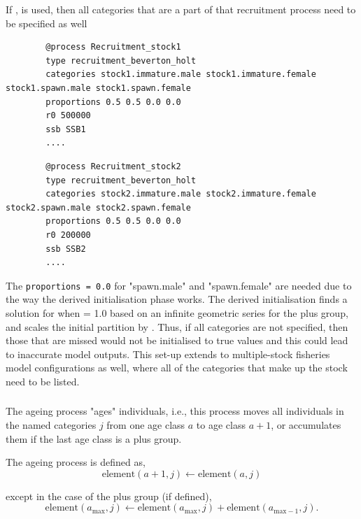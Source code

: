 If ,  is used, then all categories that are a part of that recruitment process need to be specified as well

{\small{\begin{verbatim}
		@process Recruitment_stock1
		type recruitment_beverton_holt
		categories stock1.immature.male stock1.immature.female stock1.spawn.male stock1.spawn.female
		proportions 0.5 0.5 0.0 0.0
		r0 500000
		ssb SSB1
		....
\end{verbatim}}}

{\small{\begin{verbatim}
		@process Recruitment_stock2
		type recruitment_beverton_holt
		categories stock2.immature.male stock2.immature.female stock2.spawn.male stock2.spawn.female
		proportions 0.5 0.5 0.0 0.0
		r0 200000
		ssb SSB2
		....
\end{verbatim}}}

The \texttt{proportions = 0.0} for "spawn.male" and "spawn.female" are needed due to the way the derived initialisation phase works. The derived initialisation finds a solution for when  = 1.0 based on an infinite geometric series for the plus group, and scales the initial partition by . Thus, if all categories are not specified, then those that are missed would not be initialised to true values and this could lead to inaccurate model outputs. This set-up extends to multiple-stock fisheries model configurations as well, where all of the categories that make up the stock need to be listed.


\subsubsection{\label{sec:ageing}}

The ageing process "ages" individuals, i.e., this process moves all individuals in the named categories $j$ from one age class $a$ to age class $a + 1$, or accumulates them if the last age class is a plus group.

The ageing process is defined as,
\begin{equation}
  \text{element}(a + 1,j) \leftarrow \text{element}(a,j)
\end{equation}

except in the case of the plus group (if defined),
\begin{equation}
  \text{element}(a_{\text{max}}, j) \leftarrow \text{element}(a_{\text{max}}, j) + \text{element}(a_{\text{max}-1}, j).
\end{equation}

